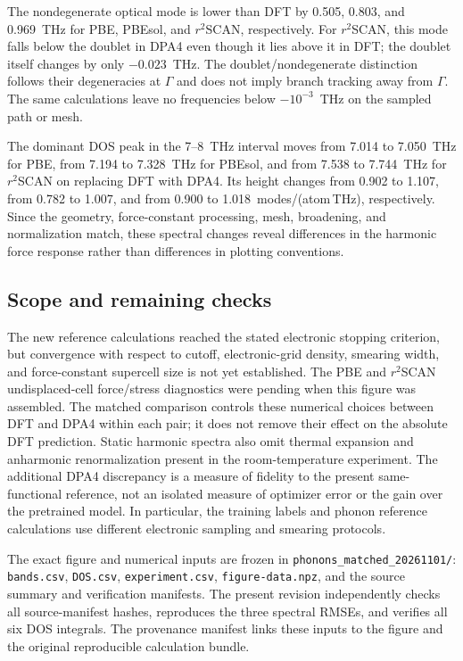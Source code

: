 \documentclass[10pt]{article}
\newcommand{\rscan}{\ensuremath{r^{2}}SCAN}
\begin{document}
The nondegenerate optical mode is lower than DFT by 0.505, 0.803, and 0.969~THz for PBE, PBEsol, and \rscan{}, respectively.
For \rscan{}, this mode falls below the doublet in DPA4 even though it lies above it in DFT; the doublet itself changes by only $-0.023$~THz.
The doublet/nondegenerate distinction follows their degeneracies at $\Gamma$ and does not imply branch tracking away from $\Gamma$.
The same calculations leave no frequencies below $-10^{-3}$~THz on the sampled path or mesh.

The dominant DOS peak in the 7--8~THz interval moves from 7.014 to 7.050~THz for PBE, from 7.194 to 7.328~THz for PBEsol, and from 7.538 to 7.744~THz for \rscan{} on replacing DFT with DPA4.
Its height changes from 0.902 to 1.107, from 0.782 to 1.007, and from 0.900 to 1.018~modes/(atom\,THz), respectively.
Since the geometry, force-constant processing, mesh, broadening, and normalization match, these spectral changes reveal differences in the harmonic force response rather than differences in plotting conventions.

\subsection{Scope and remaining checks}
The new reference calculations reached the stated electronic stopping criterion, but convergence with respect to cutoff, electronic-grid density, smearing width, and force-constant supercell size is not yet established.
The PBE and \rscan{} undisplaced-cell force/stress diagnostics were pending when this figure was assembled.
The matched comparison controls these numerical choices between DFT and DPA4 within each pair; it does not remove their effect on the absolute DFT prediction.
Static harmonic spectra also omit thermal expansion and anharmonic renormalization present in the room-temperature experiment.
The additional DPA4 discrepancy is a measure of fidelity to the present same-functional reference, not an isolated measure of optimizer error or the gain over the pretrained model. In particular, the training labels and phonon reference calculations use different electronic sampling and smearing protocols.

The exact figure and numerical inputs are frozen in \texttt{phonons\_matched\_20261101/}: \texttt{bands.csv}, \texttt{DOS.csv}, \texttt{experiment.csv}, \texttt{figure-data.npz}, and the source summary and verification manifests.
The present revision independently checks all source-manifest hashes, reproduces the three spectral RMSEs, and verifies all six DOS integrals.
The provenance manifest  links these inputs to the figure and the original reproducible calculation bundle.
\end{document}
